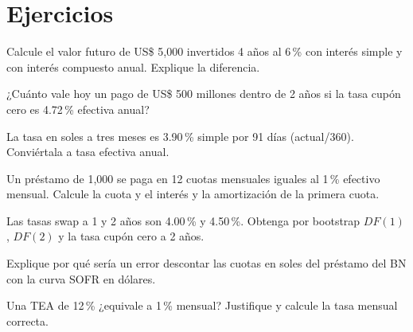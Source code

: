 \section*{Ejercicios}

\ejercicio[cálculo] Calcule el valor futuro de US\$ 5,000 invertidos 4 años al 6\,\% con interés simple y con interés compuesto anual. Explique la diferencia.

\ejercicio[cálculo] ¿Cuánto vale hoy un pago de US\$ 500 millones dentro de 2 años si la tasa cupón cero es 4.72\,\% efectiva anual?

\ejercicio[cálculo] La tasa en soles a tres meses es 3.90\,\% simple por 91 días (actual/360). Conviértala a tasa efectiva anual.

\ejercicio[cálculo] Un préstamo de 1,000 se paga en 12 cuotas mensuales iguales al 1\,\% efectivo mensual. Calcule la cuota y el interés y la amortización de la primera cuota.

\ejercicio[cálculo] Las tasas swap a 1 y 2 años son 4.00\,\% y 4.50\,\%. Obtenga por bootstrap $DF(1)$, $DF(2)$ y la tasa cupón cero a 2 años.

\ejercicio[conceptual] Explique por qué sería un error descontar las cuotas en soles del préstamo del BN con la curva SOFR en dólares.

\ejercicio[conceptual] Una TEA de 12\,\% ¿equivale a 1\,\% mensual? Justifique y calcule la tasa mensual correcta.
